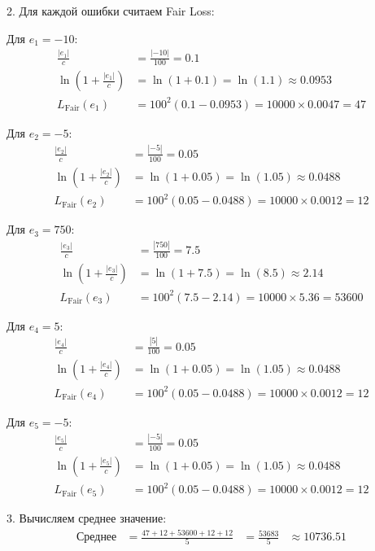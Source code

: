 2. Для каждой ошибки считаем Fair Loss:

Для $e_1 = -10$:
\[
\begin{aligned}
\frac{|e_1|}{c} &= \frac{|-10|}{100} = 0.1 \\
\ln\left(1 + \frac{|e_1|}{c}\right) &= \ln(1 + 0.1) = \ln(1.1) \approx 0.0953 \\
L_{\text{Fair}}(e_1) &= 100^2(0.1 - 0.0953) = 10000 \times 0.0047 = 47
\end{aligned}
\]

Для $e_2 = -5$:
\[
\begin{aligned}
\frac{|e_2|}{c} &= \frac{|-5|}{100} = 0.05 \\
\ln\left(1 + \frac{|e_2|}{c}\right) &= \ln(1 + 0.05) = \ln(1.05) \approx 0.0488 \\
L_{\text{Fair}}(e_2) &= 100^2(0.05 - 0.0488) = 10000 \times 0.0012 = 12
\end{aligned}
\]

Для $e_3 = 750$:
\[
\begin{aligned}
\frac{|e_3|}{c} &= \frac{|750|}{100} = 7.5 \\
\ln\left(1 + \frac{|e_3|}{c}\right) &= \ln(1 + 7.5) = \ln(8.5) \approx 2.14 \\
L_{\text{Fair}}(e_3) &= 100^2(7.5 - 2.14) = 10000 \times 5.36 = 53600
\end{aligned}
\]

Для $e_4 = 5$:
\[
\begin{aligned}
\frac{|e_4|}{c} &= \frac{|5|}{100} = 0.05 \\
\ln\left(1 + \frac{|e_4|}{c}\right) &= \ln(1 + 0.05) = \ln(1.05) \approx 0.0488 \\
L_{\text{Fair}}(e_4) &= 100^2(0.05 - 0.0488) = 10000 \times 0.0012 = 12
\end{aligned}
\]

Для $e_5 = -5$:
\[
\begin{aligned}
\frac{|e_5|}{c} &= \frac{|-5|}{100} = 0.05 \\
\ln\left(1 + \frac{|e_5|}{c}\right) &= \ln(1 + 0.05) = \ln(1.05) \approx 0.0488 \\
L_{\text{Fair}}(e_5) &= 100^2(0.05 - 0.0488) = 10000 \times 0.0012 = 12
\end{aligned}
\]

3. Вычисляем среднее значение:
\[
\begin{aligned}
\text{Среднее} &= \frac{47 + 12 + 53600 + 12 + 12}{5} &= \frac{53683}{5} &\approx 10736.51
\end{aligned}
\]
